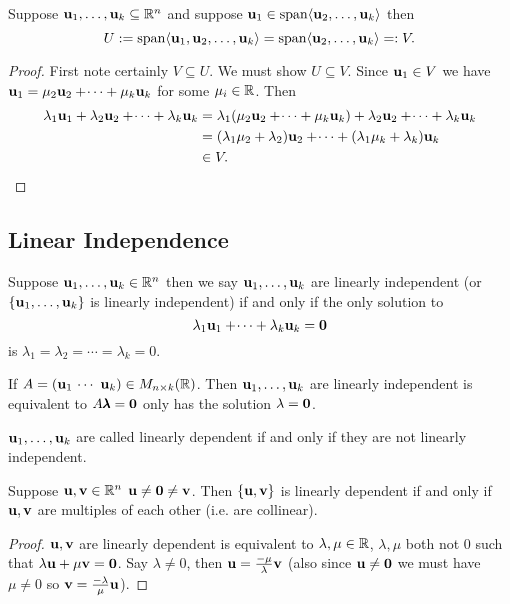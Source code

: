 \documentclass[10pt, a4paper]{article}
\begin{document}
\begin{lemma}
    Suppose $\mathbf{u}_1, \dotsc, \mathbf{u}_k \subseteq \mathbb{R} ^ n$ and suppose $\mathbf{u}_1 \in \mathrm{span}\langle\mathbf{u}_2, \dotsc, \mathbf{u}_k\rangle$ then
    \[
    U := \mathrm{span}\langle\mathbf{u}_1, \mathbf{u}_2, \dotsc, \mathbf{u}_k\rangle = \mathrm{span}\langle\mathbf{u}_2, \dotsc, \mathbf{u}_k\rangle =: V.
    \]
    \begin{proof}
        First note certainly $V \subseteq U$.
        We must show $U \subseteq V$.
        Since $\mathbf{u}_1 \in V$ we have $\mathbf{u}_1 = \mu_2\mathbf{u}_2 + \dotsi + \mu_k\mathbf{u}_k$ for some $\mu_i \in \mathbb{R}$.
        Then
        \begin{align*}
        \lambda_1\mathbf{u}_1 + \lambda_2\mathbf{u}_2 + \dotsi + \lambda_k\mathbf{u}_k &= \lambda_1(\mu_2\mathbf{u}_2 + \dotsi + \mu_k\mathbf{u}_k) + \lambda_2\mathbf{u}_2 + \dotsi + \lambda_k \mathbf{u}_k \\
        &= (\lambda_1\mu_2 + \lambda_2)\mathbf{u}_2 + \dotsi + (\lambda_1\mu_k + \lambda_k)\mathbf{u}_k \\
        &\in V.
        \end{align*}
    \end{proof}
\end{lemma}

\subsection{Linear Independence}

\begin{definition}
    Suppose $\mathbf{u}_1, \dotsc, \mathbf{u}_k \in \mathbb{R} ^ n$ then we say $\mathbf{u}_1, \dotsc, \mathbf{u}_k$ are linearly independent
    (or $\{\mathbf{u}_1, \dotsc, \mathbf{u}_k\}$ is linearly independent)
    if and only if the only solution to
    \[
    \lambda_1\mathbf{u}_1 + \dotsi + \lambda_k\mathbf{u}_k = \mathbf{0}
    \]
    is $\lambda_1 = \lambda_2 = \dotsi = \lambda_k = 0$.
\end{definition}

If $A = (\mathbf{u}_1 \ \dotsi \ \mathbf{u}_k) \in M_{n \times k}(\mathbb{R})$.
Then $\mathbf{u}_1, \dotsc, \mathbf{u}_k$ are linearly independent is equivalent to $A\pmb{\lambda} = \mathbf{0}$ only has the solution $\mathbf{\lambda = 0}$.

\begin{definition}
    $\mathbf{u}_1, \dotsc, \mathbf{u}_k$ are called linearly dependent if and only if they are not linearly independent.
\end{definition}

\begin{example}
    Suppose $\mathbf{u, v} \in \mathbb{R} ^ n$
    $\mathbf{u \neq 0 \neq v}$.
    Then $\{\mathbf{u, v}\}$ is linearly dependent if and only if $\mathbf{u, v}$ are multiples of each other (i.e. are collinear).
    \begin{proof}
        $\mathbf{u, v}$ are linearly dependent is equivalent to $\lambda, \mu \in \mathbb{R}$, $\lambda, \mu$ both not $0$ such that $\lambda\mathbf{u} + \mu\mathbf{v} = \mathbf{0}$.
        Say $\lambda \neq 0$,
        then
        $\mathbf{u} = \frac{-\mu}{\lambda}\mathbf{v}$
        (also since $\mathbf{u \neq 0}$ we must have $\mu \neq 0$ so $\mathbf{v} = \frac{-\lambda}{\mu}\mathbf{u}$).
    \end{proof}
\end{example}
\end{document}
